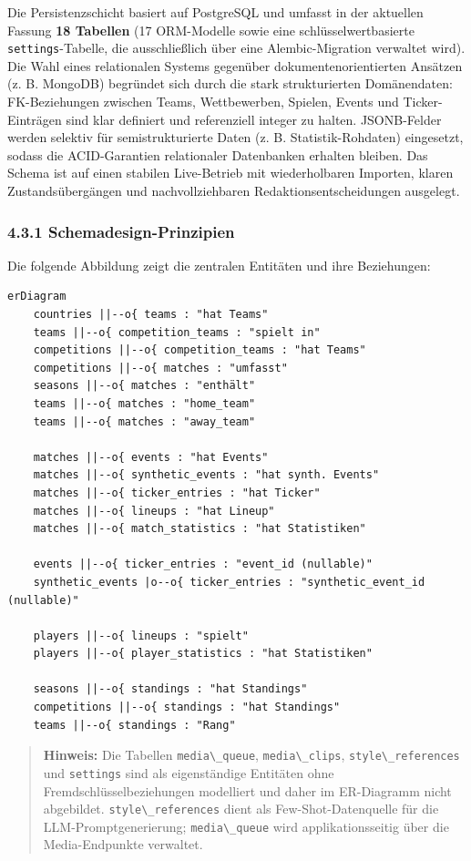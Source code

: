 Die Persistenzschicht basiert auf PostgreSQL und umfasst in der
aktuellen Fassung \textbf{18 Tabellen} (17 ORM-Modelle sowie eine
schlüsselwertbasierte \passthrough{\lstinline!settings!}-Tabelle, die
ausschließlich über eine Alembic-Migration verwaltet wird). Die Wahl
eines relationalen Systems gegenüber dokumentenorientierten Ansätzen (z.
B. MongoDB) begründet sich durch die stark strukturierten Domänendaten:
FK-Beziehungen zwischen Teams, Wettbewerben, Spielen, Events und
Ticker-Einträgen sind klar definiert und referenziell integer zu halten.
JSONB-Felder werden selektiv für semistrukturierte Daten (z. B.
Statistik-Rohdaten) eingesetzt, sodass die ACID-Garantien relationaler
Datenbanken erhalten bleiben. Das Schema ist auf einen stabilen
Live-Betrieb mit wiederholbaren Importen, klaren Zustandsübergängen und
nachvollziehbaren Redaktionsentscheidungen ausgelegt.

\subsubsection{4.3.1
Schemadesign-Prinzipien}\label{schemadesign-prinzipien}

Die folgende Abbildung zeigt die zentralen Entitäten und ihre
Beziehungen:

\begin{lstlisting}
erDiagram
    countries ||--o{ teams : "hat Teams"
    teams ||--o{ competition_teams : "spielt in"
    competitions ||--o{ competition_teams : "hat Teams"
    competitions ||--o{ matches : "umfasst"
    seasons ||--o{ matches : "enthält"
    teams ||--o{ matches : "home_team"
    teams ||--o{ matches : "away_team"

    matches ||--o{ events : "hat Events"
    matches ||--o{ synthetic_events : "hat synth. Events"
    matches ||--o{ ticker_entries : "hat Ticker"
    matches ||--o{ lineups : "hat Lineup"
    matches ||--o{ match_statistics : "hat Statistiken"

    events ||--o{ ticker_entries : "event_id (nullable)"
    synthetic_events |o--o{ ticker_entries : "synthetic_event_id (nullable)"

    players ||--o{ lineups : "spielt"
    players ||--o{ player_statistics : "hat Statistiken"

    seasons ||--o{ standings : "hat Standings"
    competitions ||--o{ standings : "hat Standings"
    teams ||--o{ standings : "Rang"
\end{lstlisting}

\begin{quote}
\textbf{Hinweis:} Die Tabellen \passthrough{\lstinline!media\_queue!},
\passthrough{\lstinline!media\_clips!},
\passthrough{\lstinline!style\_references!} und
\passthrough{\lstinline!settings!} sind als eigenständige Entitäten ohne
Fremdschlüsselbeziehungen modelliert und daher im ER-Diagramm nicht
abgebildet. \passthrough{\lstinline!style\_references!} dient als
Few-Shot-Datenquelle für die LLM-Promptgenerierung;
\passthrough{\lstinline!media\_queue!} wird applikationsseitig über die
Media-Endpunkte verwaltet.
\end{quote}

